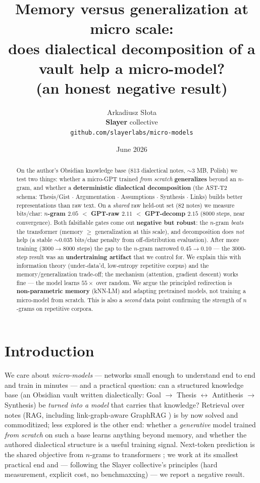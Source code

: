 \documentclass[11pt]{article}
\title{Memory versus generalization at micro scale:\\ does dialectical decomposition of a vault help a micro-model?\\ \large (an honest negative result)}
\author{Arkadiusz Słota \\ \textbf{Slayer} collective \\ \texttt{github.com/slayerlabs/micro-models}}
\date{June 2026}
\begin{document}
\maketitle

\begin{abstract}
On the author's Obsidian knowledge base (813 dialectical notes, $\sim$3 MB, Polish) we test two things: whether a
micro-GPT trained \emph{from scratch} \textbf{generalizes} beyond an $n$-gram, and whether a \textbf{deterministic
dialectical decomposition} (the AST-T2 schema: Thesis/Gist $\cdot$ Argumentation $\cdot$ Assumptions $\cdot$
Synthesis $\cdot$ Links) builds better representations than raw text. On a \emph{shared} raw held-out set (82
notes) we measure bits/char: \textbf{$n$-gram $2.05$ $<$ GPT-raw $2.11$ $<$ GPT-decomp $2.15$} (8000 steps, near
convergence). Both falsifiable gates come out \textbf{negative but robust}: the $n$-gram \emph{beats} the
transformer (memory $\geq$ generalization at this scale), and decomposition does \emph{not} help (a stable
$\sim$0.035 bits/char penalty from off-distribution evaluation). After more training (3000$\to$8000 steps) the gap
to the $n$-gram narrowed $0.45\!\to\!0.10$ --- the 3000-step result was an \textbf{undertraining artifact} that we
control for. We explain this with information theory (under-data'd, low-entropy repetitive corpus) and the
memory/generalization trade-off; the mechanism (attention, gradient descent) works fine --- the model learns
$55\times$ over random. We argue the principled redirection is \textbf{non-parametric memory} (kNN-LM) and adapting
pretrained models, not training a micro-model from scratch. This is also a \emph{second} data point confirming the
strength of $n$-grams on repetitive corpora.
\end{abstract}

\section{Introduction}
We care about \emph{micro-models} --- networks small enough to understand end to end and train in minutes --- and a
practical question: can a structured knowledge base (an Obsidian vault written dialectically: Goal $\to$ Thesis
$\leftrightarrow$ Antithesis $\to$ Synthesis) be \emph{turned into a model} that carries that knowledge? Retrieval
over notes (RAG, including link-graph-aware GraphRAG \cite{graphrag}) is by now solved and commoditized; less
explored is the other end: whether a \emph{generative} model trained \emph{from scratch} on such a base learns
anything beyond memory, and whether the authored dialectical structure is a useful training signal. Next-token
prediction is the shared objective from $n$-grams to transformers \cite{nplm,vaswani}; we work at its smallest
practical end and --- following the Slayer collective's principles (hard measurement, explicit cost, no
benchmaxxing) --- we report a negative result.
\end{document}
